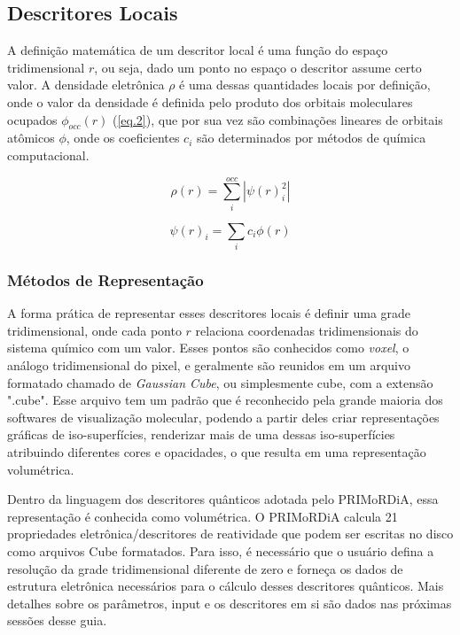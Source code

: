 \documentclass[a4paper,11pt]{refart}
\begin{document}
\subsection{Descritores Locais}

A definição matemática de um descritor local é uma função do espaço tridimensional $r$, ou seja, dado um ponto no espaço o descritor assume certo valor. A densidade eletrônica $\rho$ é uma dessas quantidades locais por definição, onde o valor da densidade é definida pelo produto dos orbitais moleculares ocupados $\phi_{occ}(r)$ (\autoref{eq.2}), que por sua vez são combinações lineares de orbitais atômicos $\phi $, onde os coeficientes $c_i$ são determinados por métodos de química computacional. 

\begin{equation}
\rho(r) = \sum_{i}^{occ} |\psi(r)^2_i|
\label{eq.2} 
\end{equation}

\begin{equation}
\psi(r)_i = \sum_{i} c_i \phi(r)
\label{eq.3} 
\end{equation}

\subsubsection{Métodos de Representação}

A forma prática de representar esses descritores locais é definir uma grade tridimensional, onde cada ponto $r$ relaciona coordenadas tridimensionais do sistema químico com um valor. Esses pontos são conhecidos como \textit{voxel}, o análogo tridimensional do pixel, e geralmente são reunidos em um arquivo formatado chamado de \textit{Gaussian Cube}, ou simplesmente cube, com a extensão ".cube". Esse arquivo tem um padrão que é reconhecido pela grande maioria dos softwares de visualização molecular, podendo a partir deles criar representações gráficas de iso-superfícies, renderizar mais de uma dessas iso-superfícies atribuindo diferentes cores e opacidades, o que resulta em uma representação volumétrica. 

Dentro da linguagem dos descritores quânticos adotada pelo PRIMoRDiA, essa representação é conhecida como volumétrica. O PRIMoRDiA calcula 21 propriedades eletrônica/descritores de reatividade que podem ser escritas no disco como arquivos Cube formatados. Para isso, é necessário que o usuário defina a resolução da grade tridimensional diferente de zero e forneça os dados de estrutura eletrônica necessários para o cálculo desses descritores quânticos. Mais detalhes sobre os parâmetros, input e os descritores em si são dados nas próximas sessões desse guia. 
\end{document}
